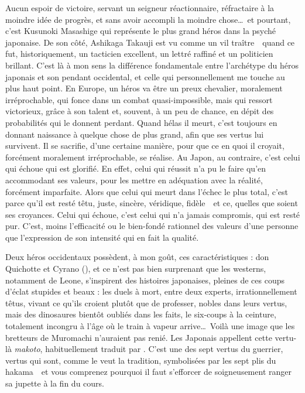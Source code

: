 Aucun espoir de victoire, servant un seigneur réactionnaire, réfractaire à la
moindre idée de progrès, et sans avoir accompli la moindre chose\dots\ et
pourtant, c'est Kusunoki Masashige qui représente le plus grand héros dans la
psyché japonaise. De son côté, Ashikaga Takauji est vu comme un vil
traître~\incise~quand ce fut, historiquement, un tacticien excellent, un lettré
raffiné et un politicien brillant. C'est là à mon sens la différence
fondamentale entre l'archétype du héros japonais et son pendant occidental, et
celle qui personnellement me touche au plus haut point. En Europe, un héros va
être un preux chevalier, moralement irréprochable, qui fonce dans un combat
quasi-impossible, mais qui ressort victorieux, grâce à son talent et, souvent,
à un peu de chance, en dépit des probabilités qui le donnent perdant. Quand
hélas il meurt, c'est toujours en donnant naissance à quelque chose de plus
grand, afin que ses vertus lui survivent. Il se sacrifie, d'une certaine
manière, pour que ce en quoi il croyait, forcément moralement irréprochable, se
réalise. Au Japon, au contraire, c'est celui qui échoue qui est glorifié. En
effet, celui qui réussit n'a pu le faire qu'en accommodant ses valeurs, pour
les mettre en adéquation avec la réalité, forcément imparfaite.  Alors que
celui qui meurt dans l'échec le plus total, c'est parce qu'il est resté têtu,
juste, sincère, véridique, fidèle~\incise~et ce, quelles que soient ses
croyances. Celui qui échoue, c'est celui qui n'a jamais compromis, qui est
resté pur. C'est, moins l'efficacité ou le bien-fondé rationnel des valeurs
d'une personne que l'expression de son intensité qui en fait la qualité.

Deux héros occidentaux possèdent, à mon goût, ces caractéristiques : don
Quichotte et Cyrano (), et ce n'est pas bien surprenant que les westerns,
notamment de Leone, s'inspirent des histoires japonaises, pleines de ces coups
d'éclat stupides et beaux : les duels à mort, entre deux experts,
irrationnellement têtus, vivant ce qu'ils croient plutôt que de professer,
nobles dans leurs vertus, mais des dinosaures bientôt oubliés dans les faits,
le six-coups à la ceinture, totalement incongru à l'âge où le train à vapeur
arrive\dots\ Voilà une image que les bretteurs de Muromachi n'auraient pas
renié. Les Japonais appellent cette vertu-là \emph{makoto}, habituellement
traduit par . C'est une des sept vertus du guerrier, vertus qui
sont, comme le veut la tradition, symbolisées par les sept plis du
hakama~\incise~et vous comprenez pourquoi il faut s'efforcer de soigneusement
ranger sa jupette à la fin du cours.
